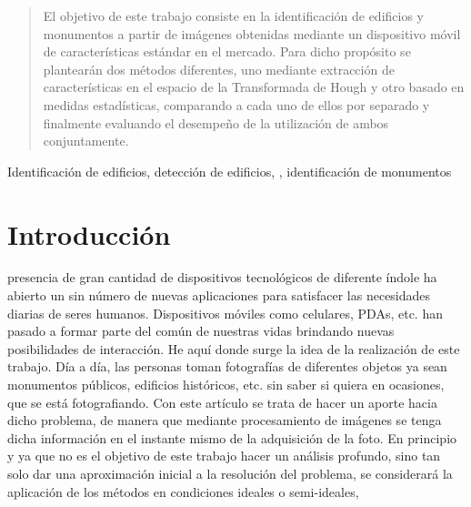 \documentclass[conference,spanish,a4paper,10pt,oneside,final]{tfmpd}
\begin{document}
\title{}
\author{Fornal Esteban, Pfarher Christian, Torrez Mauro\\
\textit{Trabajo práctico final de ``Procesamiento Digital de
Imágenes'', II-FICH-UNL.}}
\maketitle
%
%
%
%
\begin{abstract}
El objetivo de este trabajo consiste en la identificación de edificios y monumentos a partir de imágenes obtenidas mediante un dispositivo móvil de características estándar en el mercado. Para dicho propósito se plantearán dos métodos diferentes, uno mediante extracción de características en el espacio de la Transformada de Hough y otro basado en medidas estadísticas, comparando a cada uno de ellos por separado y finalmente evaluando el desempeño de la utilización de ambos conjuntamente.
\end{abstract}
%
%
%
%
\begin{keywords}
Identificación de edificios, detección de edificios, , identificación de monumentos
\end{keywords}
%
%
%
%
\section{Introducción}
 presencia de gran cantidad de dispositivos tecnológicos de diferente índole ha abierto un sin número de nuevas aplicaciones para satisfacer las necesidades diarias de seres humanos. Dispositivos móviles como celulares, PDAs, etc. han pasado a formar parte del común de nuestras vidas brindando nuevas posibilidades de interacción. He aquí donde surge la idea de la realización de este trabajo. 
Día a día, las personas toman fotografías de diferentes objetos ya sean monumentos públicos, edificios históricos, etc. sin saber si quiera en ocasiones, que se está fotografiando. Con este artículo se trata de hacer un aporte hacia dicho problema, de manera que mediante procesamiento de imágenes se tenga dicha información en el instante mismo de la adquisición de la foto.
En principio y ya que no es el objetivo de este trabajo hacer un análisis profundo, sino tan solo dar una aproximación inicial a la resolución del problema, se considerará la aplicación de los métodos en condiciones ideales o semi-ideales, 
%
%
%
%
\end{document}
